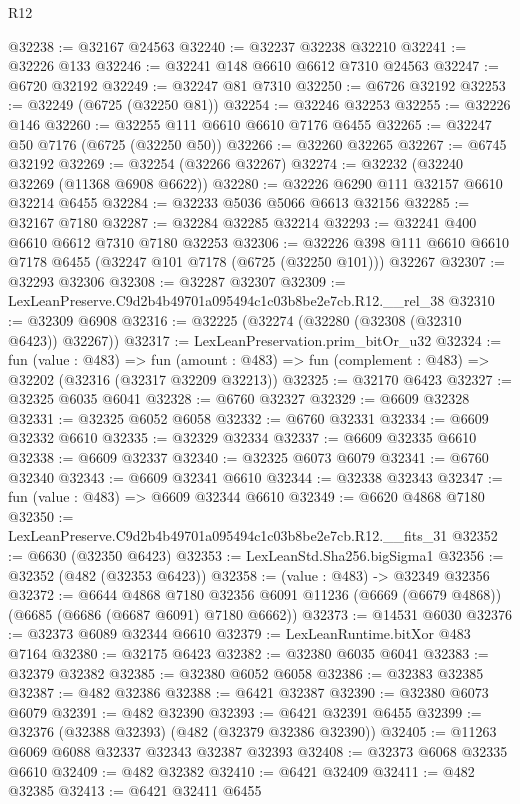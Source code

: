 \begin{lexlean}{R12}
\begin{coremodule}
@32238 := @32167 @24563
@32240 := @32237 @32238 @32210
@32241 := @32226 @133
@32246 := @32241 @148 @6610 @6612 @7310 @24563
@32247 := @6720 @32192
@32249 := @32247 @81 @7310
@32250 := @6726 @32192
@32253 := @32249 (@6725 (@32250 @81))
@32254 := @32246 @32253
@32255 := @32226 @146
@32260 := @32255 @111 @6610 @6610 @7176 @6455
@32265 := @32247 @50 @7176 (@6725 (@32250 @50))
@32266 := @32260 @32265
@32267 := @6745 @32192
@32269 := @32254 (@32266 @32267)
@32274 := @32232 (@32240 @32269 (@11368 @6908 @6622))
@32280 := @32226 @6290 @111 @32157 @6610 @32214 @6455
@32284 := @32233 @5036 @5066 @6613 @32156
@32285 := @32167 @7180
@32287 := @32284 @32285 @32214
@32293 := @32241 @400 @6610 @6612 @7310 @7180 @32253
@32306 := @32226 @398 @111 @6610 @6610 @7178 @6455 (@32247 @101 @7178 (@6725 (@32250 @101))) @32267
@32307 := @32293 @32306
@32308 := @32287 @32307
@32309 := LexLeanPreserve.C9d2b4b49701a095494c1c03b8be2e7cb.R12.__rel_38
@32310 := @32309 @6908
@32316 := @32225 (@32274 (@32280 (@32308 (@32310 @6423)) @32267))
@32317 := LexLeanPreservation.prim_bitOr_u32
@32324 := fun (value : @483) =>
  fun (amount : @483) => fun (complement : @483) => @32202 (@32316 (@32317 @32209 @32213))
@32325 := @32170 @6423
@32327 := @32325 @6035 @6041
@32328 := @6760 @32327
@32329 := @6609 @32328
@32331 := @32325 @6052 @6058
@32332 := @6760 @32331
@32334 := @6609 @32332 @6610
@32335 := @32329 @32334
@32337 := @6609 @32335 @6610
@32338 := @6609 @32337
@32340 := @32325 @6073 @6079
@32341 := @6760 @32340
@32343 := @6609 @32341 @6610
@32344 := @32338 @32343
@32347 := fun (value : @483) => @6609 @32344 @6610
@32349 := @6620 @4868 @7180
@32350 := LexLeanPreserve.C9d2b4b49701a095494c1c03b8be2e7cb.R12.__fits_31
@32352 := @6630 (@32350 @6423)
@32353 := LexLeanStd.Sha256.bigSigma1
@32356 := @32352 (@482 (@32353 @6423))
@32358 := (value : @483) -> @32349 @32356
@32372 := @6644
    @4868
    @7180
    @32356
    @6091
    @11236
    (@6669 (@6679 @4868))
    (@6685 (@6686 (@6687 @6091) @7180 @6662))
@32373 := @14531 @6030
@32376 := @32373 @6089 @32344 @6610
@32379 := LexLeanRuntime.bitXor @483 @7164
@32380 := @32175 @6423
@32382 := @32380 @6035 @6041
@32383 := @32379 @32382
@32385 := @32380 @6052 @6058
@32386 := @32383 @32385
@32387 := @482 @32386
@32388 := @6421 @32387
@32390 := @32380 @6073 @6079
@32391 := @482 @32390
@32393 := @6421 @32391 @6455
@32399 := @32376 (@32388 @32393) (@482 (@32379 @32386 @32390))
@32405 := @11263 @6069 @6088 @32337 @32343 @32387 @32393
@32408 := @32373 @6068 @32335 @6610
@32409 := @482 @32382
@32410 := @6421 @32409
@32411 := @482 @32385
@32413 := @6421 @32411 @6455

\end{coremodule}
\end{lexlean}
